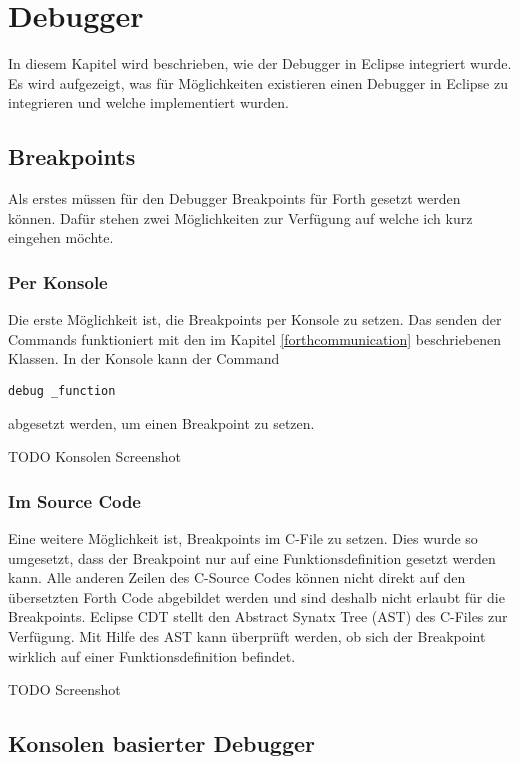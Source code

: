 \chapter{Debugger}

In diesem Kapitel wird beschrieben, wie der Debugger in Eclipse integriert wurde. Es wird aufgezeigt, was für Möglichkeiten existieren einen Debugger in Eclipse zu integrieren und welche implementiert wurden.

\section{Breakpoints}
Als erstes müssen für den Debugger Breakpoints für Forth gesetzt werden können. Dafür stehen zwei Möglichkeiten zur Verfügung auf welche ich kurz eingehen möchte.

\subsection{Per Konsole}

Die erste Möglichkeit ist, die Breakpoints per Konsole zu setzen. Das senden der Commands funktioniert mit den im Kapitel \ref{forthcommunication} beschriebenen Klassen. In der Konsole kann der Command

%
\begin{verbatim}
debug _function
\end{verbatim}
%
abgesetzt werden, um einen Breakpoint zu setzen.

TODO Konsolen Screenshot

\subsection{Im Source Code}

Eine weitere Möglichkeit ist, Breakpoints im C-File zu setzen. Dies wurde so umgesetzt, dass der Breakpoint nur auf eine Funktionsdefinition gesetzt werden kann. Alle anderen Zeilen des C-Source Codes können nicht direkt auf den übersetzten Forth Code abgebildet werden und sind deshalb nicht erlaubt für die Breakpoints.
\newline
Eclipse CDT stellt den Abstract Synatx Tree (AST) des C-Files zur Verfügung. Mit Hilfe des AST kann überprüft werden, ob sich der Breakpoint wirklich auf einer Funktionsdefinition befindet.

TODO Screenshot

\section{Konsolen basierter Debugger}

